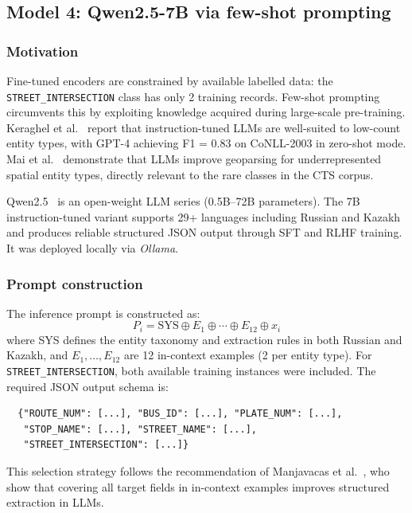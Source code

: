 \subsection{Model 4: Qwen2.5-7B via few-shot prompting}
\label{sec:llm}

\subsubsection{Motivation}

Fine-tuned encoders are constrained by available labelled data: the \texttt{STREET\_INTERSECTION} class has only 2 training records. Few-shot prompting circumvents this by exploiting knowledge acquired during large-scale pre-training. Keraghel et al.~\cite{keraghel2024survey} report that instruction-tuned LLMs are well-suited to low-count entity types, with GPT-4 achieving F1 = 0.83 on CoNLL-2003 in zero-shot mode. Mai et al.~\cite{mai2024geollm} demonstrate that LLMs improve geoparsing for underrepresented spatial entity types, directly relevant to the rare classes in the CTS corpus.

Qwen2.5~\cite{yang2024qwen} is an open-weight LLM series (0.5B--72B parameters). The 7B instruction-tuned variant supports 29+ languages including Russian and Kazakh and produces reliable structured JSON output through SFT and RLHF training. It was deployed locally via \textit{Ollama}.

\subsubsection{Prompt construction}

The inference prompt is constructed as:
\begin{equation}
  P_i = \text{SYS} \oplus E_1 \oplus \cdots \oplus E_{12} \oplus x_i
  \label{eq:prompt}
\end{equation}
where SYS defines the entity taxonomy and extraction rules in both Russian and Kazakh, and $E_1, \ldots, E_{12}$ are 12 in-context examples (2 per entity type). For \texttt{STREET\_INTERSECTION}, both available training instances were included. The required JSON output schema is:
\begin{verbatim}
  {"ROUTE_NUM": [...], "BUS_ID": [...], "PLATE_NUM": [...],
   "STOP_NAME": [...], "STREET_NAME": [...],
   "STREET_INTERSECTION": [...]}
\end{verbatim}
This selection strategy follows the recommendation of Manjavacas et al.~\cite{manjavacas2026cvs}, who show that covering all target fields in in-context examples improves structured extraction in LLMs.

